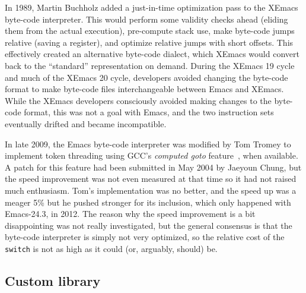 \documentclass[format=acmsmall, review]{acmart}
\begin{document}
In 1989, Martin Buchholz added a just-in-time optimization pass to the
XEmacs byte-code interpreter.  This
would perform some validity checks ahead (eliding them from the actual
execution), pre-compute stack use, make byte-code jumps relative
(saving a register), and optimize relative jumps with short offsets.
This effectively created an alternative byte-code dialect, which
XEmacs would convert back to the ``standard'' representation on
demand.
During the XEmacs 19 cycle and much of the XEmacs 20 cycle, developers
avoided changing the byte-code format to make byte-code files
interchangeable between Emacs and XEmacs.  While
the XEmacs developers consciously avoided making changes to the
byte-code format, this was not a goal with Emacs, and the two
instruction sets eventually drifted and became incompatible.

In late 2009, the Emacs byte-code interpreter was modified by Tom Tromey to
implement token threading using GCC's \emph{computed goto} feature~\cite{ComputedGOTO}, when
available.  A patch for this feature had been submitted in May 2004 by
Jaeyoun Chung, but the speed improvement was not even measured at that time
so it had not raised much enthusiasm.  Tom's implementation was no better,
and the speed up was a meager 5\% but he pushed stronger for its inclusion,
which only happened with Emacs-24.3, in 2012.  The reason why the speed
improvement is a bit disappointing was not really investigated, but the
general consensus is that the byte-code interpreter is simply not very
optimized, so the relative cost of the \texttt{switch} is not as high as it
could (or, arguably, should) be.

\subsection{Custom library}
\label{sec:custom}
\end{document}

